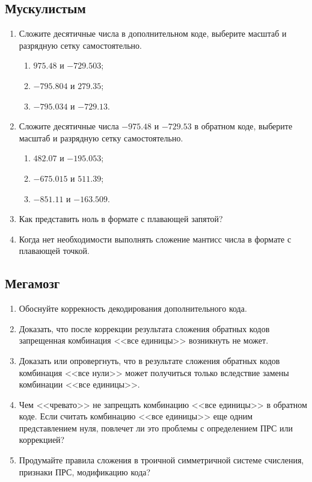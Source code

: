 \subsection{Мускулистым}

\begin{frame}[allowframebreaks]
    \begin{enumerate}
        \item Сложите десятичные числа в дополнительном коде, выберите масштаб и разрядную сетку самостоятельно.
        \begin{enumerate}   
            \item $975.48$ и $-729.503$;
            \item $-795.804$ и $279.35$;
            \item $-795.034$ и $-729.13$.
        \end{enumerate}
        \item Сложите десятичные числа $-975.48$ и $-729.53$ в обратном коде, выберите масштаб и разрядную сетку самостоятельно.
        \begin{enumerate}   
            \item $482.07$ и $-195.053$;
            \item $-675.015$ и $511.39$;
            \item $-851.11$ и $-163.509$.
        \end{enumerate}
        \item Как представить ноль в формате с плавающей запятой?
        \item Когда нет необходимости выполнять сложение мантисс числа в формате с плавающей точкой.
    \end{enumerate}
\end{frame}


\subsection{Мегамозг}

\begin{frame}[allowframebreaks]
    \begin{enumerate}
        \item Обоснуйте коррекность декодирования дополнительного кода.
        \item Доказать, что после коррекции результата сложения обратных кодов запрещенная комбинация <<все единицы>> возникнуть не может.
        \item Доказать или опровергнуть, что в результате сложения обратных кодов комбинация <<все нули>> может получиться только вследствие замены комбинации <<все единицы>>.
        \item Чем <<чревато>> не запрещать комбинацию <<все единицы>> в обратном коде. Если считать комбинацию <<все единицы>> еще одним представлением нуля, повлечет ли это проблемы с определением ПРС или коррекцией?
        \item Продумайте правила сложения в троичной симметричной системе счисления, признаки ПРС, модификацию кода?
    \end{enumerate}
\end{frame}


